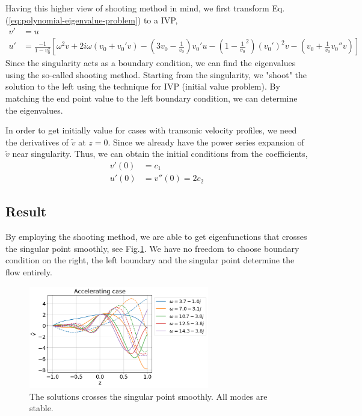 Having this higher view of shooting method in mind, we first transform Eq.(\ref{eq:polynomial-eigenvalue-problem}) to a IVP,
\begin{align*}
v' &= u\\
u' &= \frac{-1}{1-v_0^2}\left[
    \omega^2v + 2i\omega(v_0+v_0'v) - \left(3v_0 - \frac{1}{v_0}\right)v_0'u - \left(1-\frac{1}{v_0}^2\right)(v_0')^2v - \left(v_0+\frac{1}{v_0}v_0'' v\right)
\right]
\end{align*}
Since the singularity acts as a boundary condition, we can find the eigenvalues using the so-called shooting method. Starting from the singularity, we "shoot" the solution to the left using the technique for IVP (initial value problem). By matching the end point value to the left boundary condition, we can determine the eigenvalues. 

In order to get initially value for cases with transonic velocity profiles, we need the derivatives of $\tilde{v}$ at $z=0$. Since we already have the power series expansion of $\tilde{v}$ near singularity. Thus, we can obtain the initial conditions from the coefficients,
\begin{align*}
  v'(0) &= c_1 \\
  u'(0) &= v''(0) = 2c_2
\end{align*}

\subsection{Result}
By employing the shooting method, we are able to get eigenfunctions that crosses the singular point smoothly, see Fig.\ref{fig:good-accelerating-v}. We have no freedom to choose boundary condition on the right, the left boundary and the singular point determine the flow entirely.

\begin{figure}[htbp]
  \begin{center}
    \includegraphics[width=0.7\textwidth]{figures/results-accelerating-v.png}
  \end{center}
  \caption{The solutions crosses the singular point smoothly. All modes are stable.}
  \label{fig:good-accelerating-v}
\end{figure}


